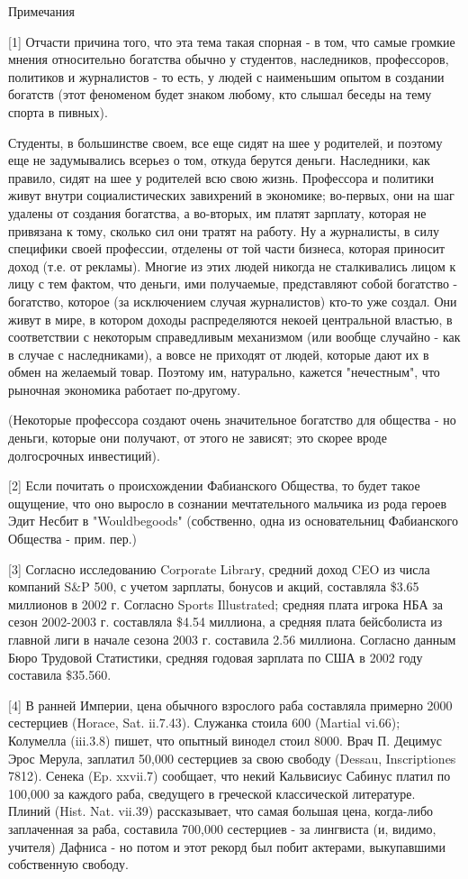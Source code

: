 \documentclass[ebook,12pt,oneside,openany]{memoir}
\begin{document}
Примечания

[1] Отчасти причина того, что эта тема такая спорная - в том, что
самые громкие мнения относительно богатства обычно у студентов,
наследников, профессоров, политиков и журналистов - то есть, у людей с
наименьшим опытом в создании богатств (этот феноменом будет знаком
любому, кто слышал беседы на тему спорта в пивных).

Студенты, в большинстве своем, все еще сидят на шее у родителей, и
поэтому еще не задумывались всерьез о том, откуда берутся деньги.
Наследники, как правило, сидят на шее у родителей всю свою жизнь.
Профессора и политики живут внутри социалистических завихрений в
экономике; во-первых, они на шаг удалены от создания богатства, а
во-вторых, им платят зарплату, которая не привязана к тому, сколько
сил они тратят на работу. Ну а журналисты, в силу специфики своей
профессии, отделены от той части бизнеса, которая приносит доход (т.е.
от рекламы). Многие из этих людей никогда не сталкивались лицом к лицу
с тем фактом, что деньги, ими получаемые, представляют собой богатство
- богатство, которое (за исключением случая журналистов) кто-то уже
создал. Они живут в мире, в котором доходы распределяются некоей
центральной властью, в соответствии с некоторым справедливым
механизмом (или вообще случайно - как в случае с наследниками), а
вовсе не приходят от людей, которые дают их в обмен на желаемый товар.
Поэтому им, натурально, кажется "нечестным", что рыночная экономика
работает по-другому.

(Некоторые профессора создают очень значительное богатство для
общества - но деньги, которые они получают, от этого не зависят; это
скорее вроде долгосрочных инвестиций).

[2] Если почитать о происхождении Фабианского Общества, то будет такое
ощущение, что оно выросло в сознании мечтательного мальчика из рода
героев Эдит Несбит в "Wouldbegoods" (собственно, одна из основательниц
Фабианского Общества - прим. пер.)

[3] Согласно исследованию Corporate Librarу, средний доход CEO из
числа компаний S\&P 500, с учетом зарплаты, бонусов и акций,
составляла \$3.65 миллионов в 2002 г. Согласно Sports Illustrated;
средняя плата игрока НБА за сезон 2002-2003 г. составляла \$4.54
миллиона, а средняя плата бейсболиста из главной лиги в начале сезона
2003 г. составила 2.56 миллиона. Согласно данным Бюро Трудовой
Статистики, средняя годовая зарплата по США в 2002 году составила
\$35.560.

[4] В ранней Империи, цена обычного взрослого раба составляла примерно
2000 сестерциев (Horace, Sat. ii.7.43). Служанка стоила 600 (Martial
vi.66); Колумелла (iii.3.8) пишет, что опытный винодел стоил 8000.
Врач П. Децимус Эрос Мерула, заплатил 50,000 сестерциев за свою
свободу (Dessau, Inscriptiones 7812). Сенека (Ep. xxvii.7) сообщает,
что некий Кальвисиус Сабинус платил по 100,000 за каждого раба,
сведущего в греческой классической литературе. Плиний (Hist. Nat.
vii.39) рассказывает, что самая большая цена, когда-либо заплаченная
за раба, составила 700,000 сестерциев - за лингвиста (и, видимо,
учителя) Дафниса - но потом и этот рекорд был побит актерами,
выкупавшими собственную свободу.
\end{document}
